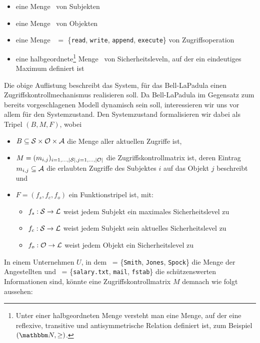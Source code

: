 \begin{itemize}
	\item eine Menge \calS\ von Subjekten 
	\item eine Menge \calO\ von Objekten
	\item eine Menge \calA\ \(=\) \{\texttt{read}, \texttt{write}, \texttt{append}, \texttt{execute}\} von Zugriffsoperation
	\item eine halbgeordnete\footnote{Unter einer halbgeordneten Menge versteht man eine Menge, auf der eine reflexive, transitive und antisymmetrische Relation definiert ist, zum Beispiel \((\N, \geq)\).} Menge \calL\ von Sicherheitsleveln, auf der ein eindeutiges Maximum definiert ist %
\end{itemize}

Die obige Auflistung beschreibt das System, für das Bell-LaPadula einen Zugriffskontrollmechanismus realisieren soll. Da Bell-LaPadula im Gegensatz zum bereits vorgeschlagenen Modell dynamisch sein soll, interessieren wir uns vor allem für den Systemzustand. Den Systemzustand formalisieren wir dabei als Tripel \((B,M,F)\), wobei

\begin{itemize}
	\item $B \subseteq \mathcal{S} \times \mathcal{O} \times \mathcal{A}$ die Menge aller aktuellen Zugriffe ist,
	\item $M = (m_{i, j})_{i = 1,..., \vert \mathcal{S} \vert, j = 1,...,\vert \mathcal{O} \vert}$ die Zugriffskontrollmatrix ist, deren Eintrag $m_{i, j} \subseteq \mathcal{A}$ die erlaubten Zugriffe des Subjektes $i$ auf das Objekt $j$ beschreibt und
	\item $F = (f_s, f_c, f_o)$ ein Funktionstripel ist, mit:
	\begin{itemize}
		\item $f_s: \mathcal{S} \rightarrow \mathcal{L}$ weist jedem Subjekt ein maximales Sicherheitslevel zu
		\item $f_c: \mathcal{S} \rightarrow \mathcal{L}$ weist jedem Subjekt sein aktuelles Sicherheitslevel zu 
		\item $f_o: \mathcal{O} \rightarrow \mathcal{L}$ weist jedem Objekt ein Sicherheitslevel zu
	\end{itemize}
\end{itemize}
 
In einem Unternehmen \(U\), in dem \calS\ = \{\texttt{Smith}, \texttt{Jones}, \texttt{Spock}\} die Menge der Angestellten
und \calO\ = \{\texttt{salary.txt}, \texttt{mail}, \texttt{fstab}\} die schützenswerten Informationen sind, könnte
eine Zugriffskontrollmatrix \(M\) demnach wie folgt aussehen:

